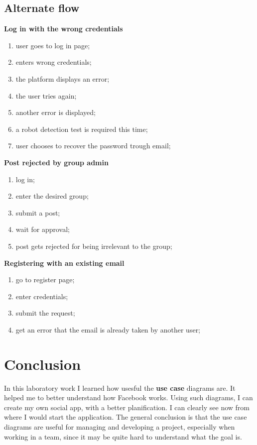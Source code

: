 \documentclass{article}
\begin{document}
		\subsection{Alternate flow}
			\textbf{Log in with the wrong credentials}
			\begin{enumerate}
				\item user goes to log in page;
				\item enters wrong credentials;
				\item the platform displays an error;
				\item the user tries again;
				\item another error is displayed;
				\item a robot detection test is required this time;
				\item user chooses to recover the password trough email;
			\end{enumerate}

			\textbf{Post rejected by group admin}
			\begin{enumerate}
				\item log in;
				\item enter the desired group;
				\item submit a post;
				\item wait for approval;
				\item post gets rejected for being irrelevant to the group;
			\end{enumerate}

			\textbf{Registering with an existing email}
			\begin{enumerate}
				\item go to register page;
				\item enter credentials;
				\item submit the request;
				\item get an error that the email is already taken by another user;
			\end{enumerate}

	\section{Conclusion}
		In this laboratory work I learned how usesful the \textbf{use case} diagrams are. It helped me to better understand how Facebook works. Using such diagrams, I can create my own social app, with a better planification. I can clearly see now from where I would start the application. The general conclusion is that the use case diagrams are useful for managing and developing a project, especially when working in a team, since it may be quite hard to understand what the goal is.
\end{document}
